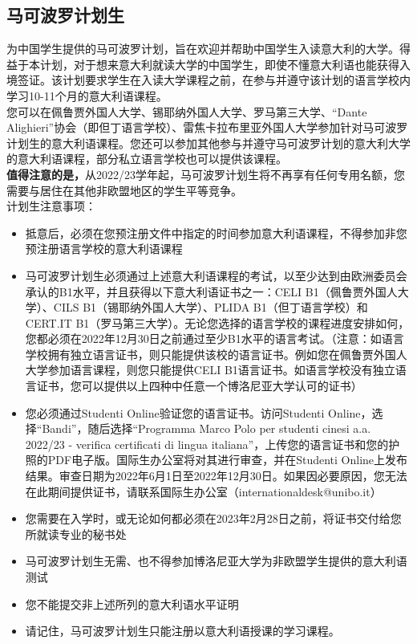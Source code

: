\subsection{马可波罗计划生}
为中国学生提供的马可波罗计划，旨在欢迎并帮助中国学生入读意大利的大学。得益于本计划，对于想来意大利就读大学的中国学生，即使不懂意大利语也能获得入境签证。该计划要求学生在入读大学课程之前，在参与并遵守该计划的语言学校内学习10-11个月的意大利语课程。\\
您可以在佩鲁贾外国人大学、锡耶纳外国人大学、罗马第三大学、“Dante Alighieri”协会（即但丁语言学校）、雷焦卡拉布里亚外国人大学参加针对马可波罗计划生的意大利语课程。您还可以参加其他参与并遵守马可波罗计划的意大利大学的意大利语课程，部分私立语言学校也可以提供该课程。\\
\textbf{值得注意的是，}从2022/23学年起，马可波罗计划生将不再享有任何专用名额，您需要与居住在其他非欧盟地区的学生平等竞争。\\
计划生注意事项：
\begin{itemize}
\item 抵意后，必须在您预注册文件中指定的时间参加意大利语课程，不得参加非您预注册语言学校的意大利语课程 
\item 马可波罗计划生必须通过上述意大利语课程的考试，以至少达到由欧洲委员会承认的B1水平，并且获得以下意大利语证书之一：CELI B1（佩鲁贾外国人大学）、CILS B1（锡耶纳外国人大学）、PLIDA B1（但丁语言学校）和CERT.IT B1（罗马第三大学）。无论您选择的语言学校的课程进度安排如何，您都必须在2022年12月30日之前通过至少B1水平的语言考试。（注意：如语言学校拥有独立语言证书，则只能提供该校的语言证书。例如您在佩鲁贾外国人大学参加语言课程，则您只能提供CELI B1语言证书。如语言学校没有独立语言证书，您可以提供以上四种中任意一个博洛尼亚大学认可的证书）
\item 您必须通过Studenti Online验证您的语言证书。访问Studenti Online，选择“Bandi”，随后选择“Programma Marco Polo per studenti cinesi a.a. 2022/23 - verifica certificati di lingua italiana”，上传您的语言证书和您的护照的PDF电子版。国际生办公室将对其进行审查，并在Studenti Online上发布结果。审查日期为2022年6月1日至2022年12月30日。如果因必要原因，您无法在此期间提供证书，请联系国际生办公室（internationaldesk@unibo.it）
\item 您需要在入学时，或无论如何都必须在2023年2月28日之前，将证书交付给您所就读专业的秘书处
\item 马可波罗计划生无需、也不得参加博洛尼亚大学为非欧盟学生提供的意大利语测试
\item 您不能提交非上述所列的意大利语水平证明
\item 请记住，马可波罗计划生只能注册以意大利语授课的学习课程。
\end{itemize}
